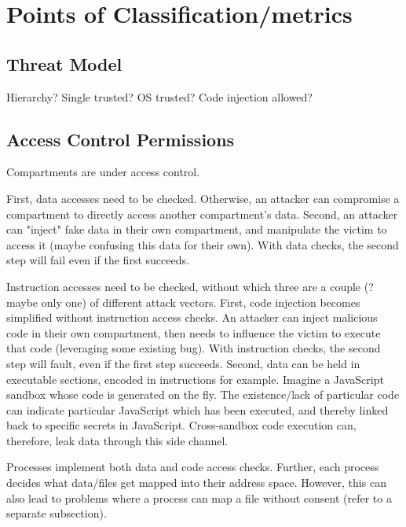 \section{Points of Classification/metrics}

\subsection{Threat Model}
Hierarchy?
Single trusted?
OS trusted?
Code injection allowed?

\subsection{Access Control Permissions}

Compartments are under access control. 

First, data accesses need to be checked. 
Otherwise, an attacker can compromise a compartment to directly access another
compartment's data.
Second, an attacker can "inject" fake data in their own compartment, and 
manipulate the victim to access it (maybe confusing this data for their own).
With data checks, the second step will fail even if the first succeeds.

Instruction accesses need to be checked, without which three are a 
couple (? maybe only one) of different attack vectors.
First, code injection becomes simplified without instruction access checks.
An attacker can inject malicious code in their own compartment, then needs
to influence the victim to execute that code (leveraging some existing bug).
With instruction checks, the second step will fault, even if the first step
succeeds.
Second, data can be held in executable sections, encoded in instructions for example.
Imagine a JavaScript sandbox whose code is generated on the fly. 
The existence/lack of particular code can indicate particular JavaScript which has
been executed, and thereby linked back to specific secrets in JavaScript.
Cross-sandbox code execution can, therefore, leak data through this side channel.

Processes implement both data and code access checks. 
Further, each process decides what data/files get mapped into their address space.
However, this can also lead to problems where a process can map a file without
consent (refer to a separate subsection).

